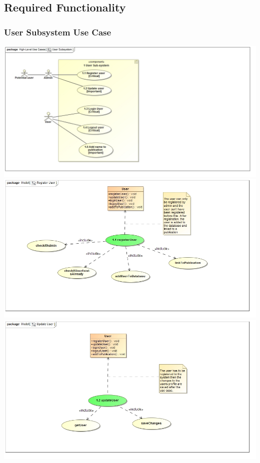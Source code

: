 \documentclass{article}
\begin{document}
		\subsection{Required Functionality}
			\subsubsection{User Subsystem Use Case}
				\includegraphics[width=\textwidth]{UserSubsystem}
				\includegraphics[width=\textwidth]{RegisterUser}
				\includegraphics[width=\textwidth]{UpdateUser}
\end{document}
